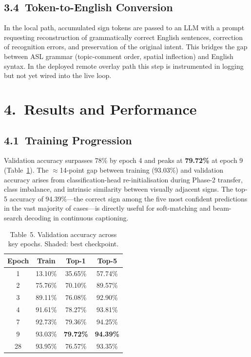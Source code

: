 \documentclass[10pt, twocolumn]{article}
\begin{document}
\subsection*{3.4~Token-to-English Conversion}
In the local path, accumulated sign tokens are passed to an LLM with a prompt requesting reconstruction of grammatically correct English sentences, correction of recognition errors, and preservation of the original intent. This bridges the gap between ASL grammar (topic-comment order, spatial inflection) and English syntax. In the deployed remote overlay path this step is instrumented in logging but not yet wired into the live loop.

\section*{4.~Results and Performance}

\subsection*{4.1~Training Progression}
Validation accuracy surpasses 78\% by epoch 4 and peaks at \textbf{79.72\%} at epoch 9 (Table~\ref{tab:epochs}). The $\approx$14-point gap between training (93.03\%) and validation accuracy arises from classification-head re-initialisation during Phase-2 transfer, class imbalance, and intrinsic similarity between visually adjacent signs. The top-5 accuracy of 94.39\%---the correct sign among the five most confident predictions in the vast majority of cases---is directly useful for soft-matching and beam-search decoding in continuous captioning.

\begin{table}[h]
\centering
\caption{Table~5. Validation accuracy across key epochs. \colorbox{yellow!40}{Shaded: best checkpoint.}}
\label{tab:epochs}
\small
\begin{tabular}{|c|c|c|c|}
\hline
\textbf{Epoch} & \textbf{Train} & \textbf{Top-1} & \textbf{Top-5} \\
\hline
1  & 13.10\% & 35.65\% & 57.74\% \\
2  & 75.76\% & 70.10\% & 89.57\% \\
3  & 89.11\% & 76.08\% & 92.90\% \\
4  & 91.61\% & 78.27\% & 93.81\% \\
7  & 92.73\% & 79.36\% & 94.25\% \\
\rowcolor{yellow!40}
9  & 93.03\% & \textbf{79.72\%} & \textbf{94.39\%} \\
28 & 93.95\% & 76.57\% & 93.35\% \\
\hline
\end{tabular}
\end{table}
\end{document}
